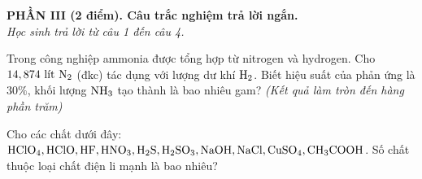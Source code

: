 \documentclass[11pt,a4paper]{article}
\begin{document}
\vspace{4pt}
\noindent
{\color{mainGreen}\textbf{\Large PHẦN III (2 điểm). Câu trắc nghiệm trả lời ngắn.}}\\
\textit{\small Học sinh trả lời từ câu 1 đến câu 4.}
\vspace{2pt}

\begin{ex}
Trong công nghiệp ammonia được tổng hợp từ nitrogen và hydrogen. Cho $14,874\text{ lít }\ce{N2}$ (đkc) tác dụng với lượng dư khí $\ce{H2}$. Biết hiệu suất của phản ứng là $30\%$, khối lượng $\ce{NH3}$ tạo thành là bao nhiêu gam? \textit{(Kết quả làm tròn đến hàng phần trăm)}

\end{ex}
\begin{ex}
Cho các chất dưới đây: $\ce{HClO4}, \ce{HClO}, \ce{HF}, \ce{HNO3}, \ce{H2S}, \ce{H2SO3}, \ce{NaOH}, \ce{NaCl}, \ce{CuSO4}, \ce{CH3COOH}$. Số chất thuộc loại chất điện li mạnh là bao nhiêu?

\end{ex}
\end{document}

